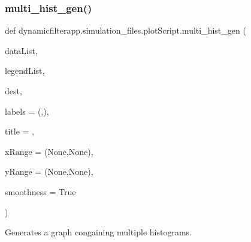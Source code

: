 \subsubsection{\texorpdfstring{multi\_hist\_gen()}{multi\_hist\_gen()}}
{\footnotesize\ttfamily def dynamicfilterapp.\+simulation\+\_\+files.\+plot\+Script.\+multi\+\_\+hist\+\_\+gen (\begin{DoxyParamCaption}\item[{}]{data\+List,  }\item[{}]{legend\+List,  }\item[{}]{dest,  }\item[{}]{labels = {\ttfamily (\textquotesingle{}\textquotesingle{},\textquotesingle{}\textquotesingle{})},  }\item[{}]{title = {\ttfamily \textquotesingle{}\textquotesingle{}},  }\item[{}]{x\+Range = {\ttfamily (None,None)},  }\item[{}]{y\+Range = {\ttfamily (None,None)},  }\item[{}]{smoothness = {\ttfamily True} }\end{DoxyParamCaption})}



Generates a graph congaining multiple histograms. 


